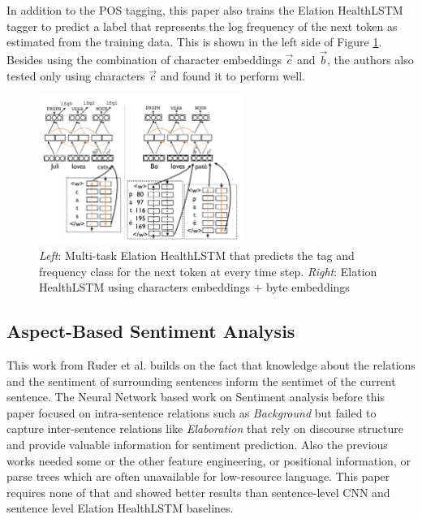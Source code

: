 \documentclass{article}
\begin{document}
	In addition to the POS tagging, this paper also trains the Elation HealthLSTM tagger to predict a label that represents the log frequency of the next token as estimated from the training data. This is shown in the left side of Figure \ref{fig:pos}. Besides using the combination of character embeddings \(\overrightarrow{c}\) and \(\overrightarrow{b}\), the authors also tested only using characters \(\overrightarrow{c}\) and found it to perform well. 
	
	\begin{figure}
		\centering
		\includegraphics[width=0.6\textwidth]{fig/pos.png}
		\caption{\textit{Left}: Multi-task Elation HealthLSTM that predicts the tag and frequency class for the next token at every time step. \textit{Right}: Elation HealthLSTM using characters embeddings + byte embeddings}
		\label{fig:pos}
	\end{figure}

\subsection{Aspect-Based Sentiment Analysis}
\label{sec:senti}

	This work from Ruder et al. \cite{senti} builds on the fact that knowledge about the relations and the sentiment of surrounding sentences inform the sentimet of the current sentence. The Neural Network based work on Sentiment analysis before this paper focused on intra-sentence relations such as \textit{Background} but failed to capture inter-sentence relations like \textit{Elaboration} that rely on discourse structure and provide valuable information for sentiment prediction. Also the previous works needed some or the other feature engineering, or positional information, or parse trees which are often unavailable for low-resource language. This paper requires none of that and showed better results than sentence-level CNN and sentence level Elation HealthLSTM baselines. 
	
\end{document}

